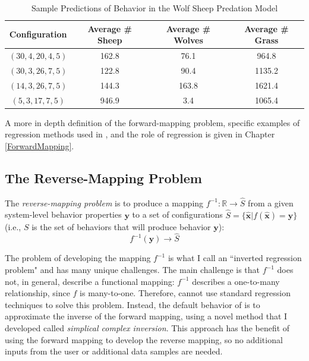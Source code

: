 \begin{table}[ht]
  \caption{Sample Predictions of Behavior in the Wolf Sheep Predation Model}
  \centering
  \begin{tabular}{c c c c}
    \hline \hline
    Configuration & Average \# Sheep & Average \# Wolves & Average \# Grass \\
    \hline
    $(30, 4, 20, 4, 5)$ & 162.8 & 76.1 & 964.8 \\
    $(30, 3, 26, 7, 5)$ & 122.8 & 90.4 & 1135.2 \\
    $(14, 3, 26, 7, 5)$ & 144.3 & 163.8 & 1621.4 \\
    $(5, 3, 17, 7, 5)$ & 946.9 & 3.4 & 1065.4 \\
    \hline
  \end{tabular}
  \label{table:ws_predictions}
\end{table}


A more in depth definition of the forward-mapping problem, specific examples of regression methods used in \fw, and the role of regression is given in Chapter \ref{ForwardMapping}.


\subsection{The Reverse-Mapping Problem}



The \textit{reverse-mapping problem} is to produce a mapping $ f^{-1}: \mathbb{R} \rightarrow \hat S$ from a given system-level behavior properties $\mathbf y$ to a set of
configurations $ \hat S = \{ \mathbf {\hat x} | f( \mathbf {\hat x}) = \mathbf y \}$
(i.e., $S$ is the set of behaviors that will produce behavior $\mathbf y$):
\[f^{-1}(\mathbf y) \rightarrow \hat S\]


The problem of developing the mapping $f^{-1}$ is what I call an ``inverted regression problem" and has many unique challenges.
The main challenge is that $f^{-1}$ does not, in general, describe a functional mapping:
$f^{-1}$ describes a one-to-many relationship, since $f$ is many-to-one.
Therefore, \fw cannot use standard regression techniques to solve this problem.
Instead, the default behavior of \fw is to approximate the inverse of the forward mapping, using a novel method that I developed called \textit{simplical complex inversion}.
This approach has the benefit of using the forward mapping to develop the reverse mapping, so no additional inputs from the user or additional data samples are needed.

